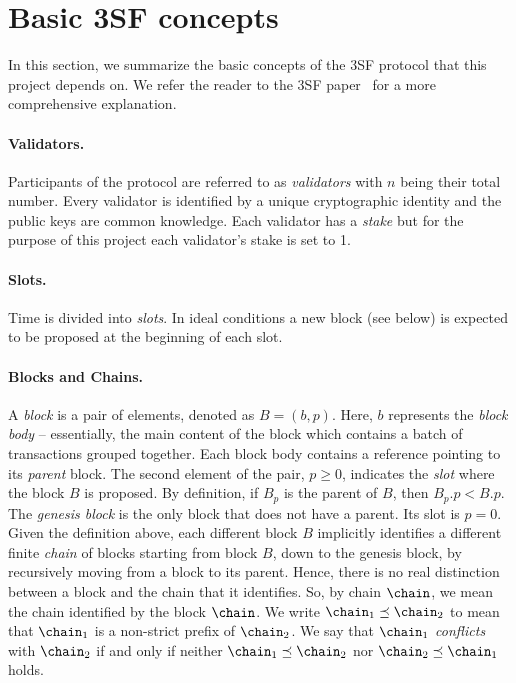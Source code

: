 
\section{Basic 3SF concepts}\label{sec:3sf}

In this section, we summarize the basic concepts of the 3SF protocol that this project depends on.
We refer the reader to the 3SF paper~\cite{d20243} for a more comprehensive explanation.

\paragraph*{Validators.} Participants of the protocol are referred to as \emph{validators} with $n$ being their total number.
Every validator is identified by a unique cryptographic identity and the public keys are common knowledge. 
Each validator has a \emph{stake} but for the purpose of this project each validator's stake is set to 1.

\paragraph*{Slots.} Time is divided into \emph{slots}. 
In ideal conditions a new block (see below) is expected to be proposed at the beginning of each slot.

\paragraph{Blocks and Chains.} 
A \emph{block} is a pair of elements, denoted as \( B = (b,p) \). Here, \( b \) represents the \emph{block body} -- essentially, the main content of the block which contains a batch of transactions grouped together.
Each block body contains a reference pointing to its \emph{parent} block. 
The second element of the pair, \( p \geq 0 \), indicates the \emph{slot} where the block \( B \) is proposed.
By definition, if $B_p$ is the parent of $B$, then $B_p.p < B.p$.
The \emph{genesis block} is the only block that does not have a parent. Its slot is \( p = 0 \).
Given the definition above, each different block $B$ implicitly identifies a different finite \emph{chain} of blocks starting from block $B$, down to the genesis block, by recursively moving from a block to its parent.
Hence, there is no real distinction between a block and the chain that it identifies.
So, by chain $\chain$, we mean the chain identified by the block $\chain$.
We write $\chain_1 \preceq \chain_2$ to mean that $\chain_1$ is a non-strict prefix of $\chain_2$.
We say that $\chain_1$ \emph{conflicts} with $\chain_2$ if and only if neither $\chain_1 \preceq \chain_2$ nor $\chain_2 \preceq \chain_1$ holds. 

